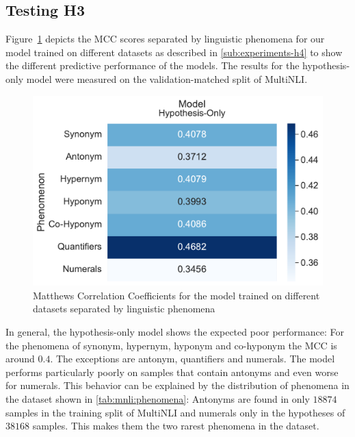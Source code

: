 \subsection{Testing H3}
Figure~\ref{fig:metric-heatmap-phenomena-mcc-hyponly} depicts the \ac{MCC} scores separated by linguistic phenomena for our model trained on different datasets as described in \autoref{sub:experiments-h4} to show the different predictive performance of the models. The results for the hypothesis-only model were measured on the validation-matched split of \ac{MultiNLI}.

\begin{figure}[h!]
    \centering
    \includegraphics[width=0.9\columnwidth]{./images/metric_heatmaps_phenomena/important_words/hypothesis_only_matthews_correlation.pdf}
    \caption{Matthews Correlation Coefficients for the model trained on different datasets separated by linguistic phenomena}
    \label{fig:metric-heatmap-phenomena-mcc-hyponly}
\end{figure}

In general, the hypothesis-only model shows the expected poor performance: For the phenomena of synonym, hypernym, hyponym and co-hyponym the \ac{MCC} is around $0.4$. The exceptions are antonym, quantifiers and numerals. The model performs particularly poorly on samples that contain antonyms and even worse for numerals. This behavior can be explained by the distribution of phenomena in the dataset shown in \autoref{tab:mnli:phenomena}: Antonyms are found in only $18874$ samples in the training split of \ac{MultiNLI} and numerals only in the hypotheses of $38168$ samples. This makes them the two rarest phenomena in the dataset. 

